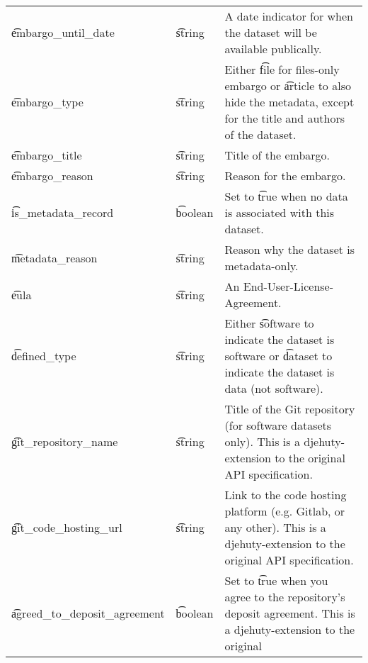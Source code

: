\begin{tabular}{p{} p{} p{}}
  \t{embargo\_until\_date} & \t{string}     & A date indicator for when the
                                              dataset will be available
                                              publically.\\
  \t{embargo\_type}  & \t{string}           & Either \t{file} for files-only
                                              embargo or \t{article} to also
                                              hide the metadata, except for the
                                              title and authors of the dataset.\\
  \t{embargo\_title} & \t{string}           & Title of the embargo.\\
  \t{embargo\_reason} & \t{string}          & Reason for the embargo.\\
  \t{is\_metadata\_record} & \t{boolean}    & Set to \t{true} when no data is
                                              associated with this dataset.\\
  \t{metadata\_reason} & \t{string}         & Reason why the dataset is
                                              metadata-only.\\
  \t{eula}           & \t{string}           & An End-User-License-Agreement.\\
  \t{defined\_type}  & \t{string}           & Either \t{software} to indicate
                                              the dataset is software or
                                              \t{dataset} to indicate the
                                              dataset is data (not software).\\
  \t{git\_repository\_name} & \t{string}    & Title of the Git repository (for
                                              software datasets only).  This is
                                              a djehuty-extension to the
                                              original API specification.\\
  \t{git\_code\_hosting\_url} & \t{string}  & Link to the code hosting platform
                                              (e.g. Gitlab, or any other).  This
                                              is a djehuty-extension to the
                                              original API specification.\\
  \t{agreed\_to\_deposit\_agreement} & \t{boolean} & Set to \t{true} when you
                                              agree to the repository's deposit
                                              agreement.  This is a
                                              djehuty-extension to the original

\end{tabular}
